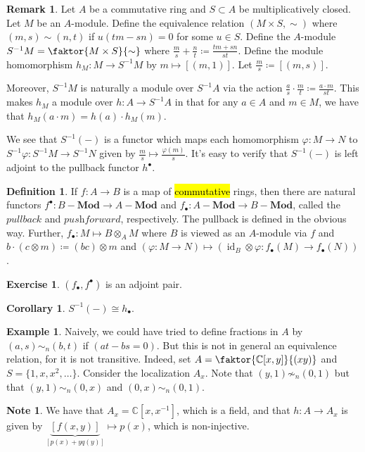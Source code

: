 \documentclass[10pt,letterpaper,cm]{nupset}
\theoremstyle{definition}
\newtheorem*{definition}{Definition}
\newtheorem{exmp}{Example}
\newtheorem{note}{Note}
\newtheorem{remark}{Remark}
\newtheorem{corollary}{Corollary}
\newtheorem{exercise}{Exercise}
\newcommand{\C}{\mathbb C}
\newcommand{\1}{\mathbf{1}}
\newcommand{\0}{\vec 0}
\DeclareMathOperator{\id}{id}
\begin{document}
\begin{remark}
Let $A$ be a commutative ring and $S \subset A$ be multiplicatively closed. Let $M$ be an $A$-module. Define the equivalence relation $(M \times S, \sim)$ where $(m, s) \sim (n, t)$ if $u(tm - sn) = 0$ for some $u\in S$. Define the $A$-module $S^{-1}M = \faktor{M \times S}{\sim}$ where $\frac{m}{s} + \frac{n}{t} \coloneqq  \frac{tm + sn}{st}$. Define the module homomorphism $h_M : M \to S^{-1}M$ by $m \mapsto [(m,1)]$.  Let $\frac{m}{s} \coloneqq  [(m,s)]$.

Moreover, $S^{-1}M$ is naturally a module over $S^{-1}A$ via the action $\frac{a}{s} \cdot \frac{m}{t} \coloneqq  \frac{a\cdot m}{st}$. This makes $h_M$ a module over $h: A \to S^{-1}A$ in  that for any $a\in A$ and $m\in M$, we have that $h_M(a\cdot m) = h(a) \cdot h_M(m)$.

We see that $S^{-1}(-)$ is a functor which maps each homomorphism $\varphi : M \to N$ to $S^{-1}\varphi : S^{-1}M \to S^{-1}N$ given by $\frac{m}{s} \mapsto \frac{\varphi(m)}{s}$.  It's easy to verify that $S^{-1}(-)$ is left adjoint to the pullback functor $h^{\bullet}$.
\end{remark}

\begin{definition}
If $f: A \to B$ is a map of \hl{commutative} rings, then there are natural functors $f^{\bullet}: B{-}\mathbf{Mod} \to A{-}\mathbf{Mod}$ and $f_{\bullet} : A{-} \mathbf{Mod} \to B{-} \mathbf{Mod}$, called the $\textit{pullback}$ and $\textit{pushforward}$, respectively. The pullback is defined in the obvious way. Further, $f_{\bullet} : M \mapsto B \otimes_A M$ where $B$ is viewed as an $A$-module via $f$ and $b\cdot(c \otimes m) \coloneqq  (bc) \otimes m$ and $(\varphi : M \to N) \mapsto (\id_B \otimes \varphi : f_{\bullet}(M) \to f_{\bullet}(N))$. 
\end{definition}

\begin{exercise}
$(f_{\bullet}, f^{\bullet})$ is an adjoint pair.
\end{exercise}
\begin{corollary}
$S^{-1}(-) \cong h_{\bullet}$.
\end{corollary}

\begin{exmp}
Naively, we could have tried to define fractions in $A$ by  $(a,s) \sim_n (b,t)$ if $(at-bs =0)$. But this is not in general an equivalence relation, for it is not transitive. Indeed, set $A = \faktor{\C[x,y]}{(xy)}$ and $S = \{1, x, x^2, \ldots\}$. Consider the localization $A_x$. Note that $(y,1) \not \sim_n (0,1)$ but that $(y,1) \sim_n (0,x)$ and $(0,x) \sim_n (0,1)$.
\begin{note}
We have that $A_x = \C[x,x^{-1}]$, which is a field, and that $h: A \to A_x$ is given by $\underbrace{[f(x,y)]}_{[p(x) +yq(y)]} \mapsto p(x)$, which is non-injective.
\end{note}
\end{exmp}
\end{document}
